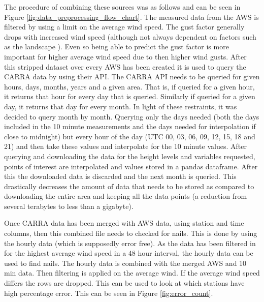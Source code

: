The procedure of combining these sources was as follows and can be seen in Figure \ref{fig:data_preprocessing_flow_chart}. The measured data from the AWS is filtered by using a limit on the average wind speed. The gust factor generally drops with increased wind speed (although not always dependent on factors such as the landscape \cite{GNP_vidtal}). Even so being able to predict the gust factor is more important for higher average wind speed due to then higher wind gusts. After this stripped dataset over every AWS has been created it is used to query the CARRA data by using their API. The CARRA API needs to be queried for given hours, days, months, years and a given area. That is, if queried for a given hour, it returns that hour for every day that is queried. Similarly if queried for a given day, it returns that day for every month. In light of these restraints, it was decided to query month by month. Querying only the days needed (both the days included in the 10 minute measurements and the days needed for interpolation if close to midnight) but every hour of the day (UTC 00, 03, 06, 09, 12, 15, 18 and 21) and then take these values and interpolate for the 10 minute values. After querying and downloading the data for the height levels and variables requested, points of interest are interpolated and values stored in a pandas dataframe. After this the downloaded data is discarded and the next month is queried. This drastically decreases the amount of data that needs to be stored as compared to downloading the entire area and keeping all the data points (a reduction from several terabytes to less than a gigabyte).

Once CARRA data has been merged with AWS data, using station and time columns, then this combined file needs to checked for nails. This is done by using the hourly data (which is supposedly error free). As the data has been filtered in for the highest average wind speed in a 48 hour interval, the hourly data can be used to find nails. The hourly data is combined with the merged AWS and 10 min data. Then filtering is applied on the average wind. If the average wind speed differs the rows are dropped. This can be used to look at which stations have high percentage error. This can be seen in Figure \ref{fig:error_count}.

